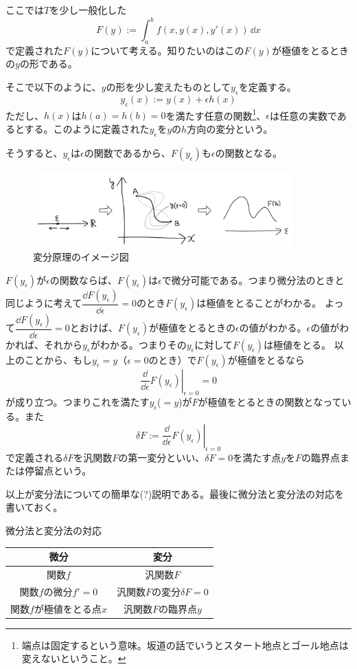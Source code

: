 ここでは$T$を少し一般化した
$$ F(y) := \int_a^b f(x,y(x),y'(x)) \,\dd x$$
で定義された$F(y)$について考える。知りたいのはこの$F(y)$が極値をとるときの$y$の形である。\par
そこで以下のように、$y$の形を少し変えたものとして$y_\epsilon$を定義する。
$$ y_\epsilon (x) := y(x) + \epsilon h(x) $$
ただし、$h(x)$は$h(a) = h(b) = 0$を満たす任意の関数\footnote{端点は固定するという意味。坂道の話でいうとスタート地点とゴール地点は変えないということ。}、$\epsilon$は任意の実数であるとする。このように定義された$y_\epsilon$を$y$の$h$方向の変分という。\par
そうすると、$y_\epsilon$は$\epsilon$の関数であるから、$F(y_\epsilon)$も$\epsilon$の関数となる。\par
\begin{figure}[H]
  \centering
  \includegraphics[width = 100mm]{nakayama1/image/henbun.png}\\
  {\small 変分原理のイメージ図}
\end{figure}

$F(y_\epsilon)$が$\epsilon$の関数ならば、$F(y_\epsilon)$は$\epsilon$で微分可能である。つまり微分法のときと同じように考えて$\dfrac{\dd F(y_\epsilon)}{\dd \epsilon} = 0$のとき$F(y_\epsilon)$は極値をとることがわかる。
よって$\dfrac{\dd F(y_\epsilon)}{\dd \epsilon} = 0$とおけば、$F(y_\epsilon)$が極値をとるときの$\epsilon$の値がわかる。$\epsilon$の値がわかれば、それから$y_\epsilon$がわかる。つまりその$y_\epsilon$に対して$F(y_\epsilon)$は極値をとる。
以上のことから、もし$y_\epsilon = y$（$\epsilon = 0$のとき）で$F(y_\epsilon)$が極値をとるなら
$$\left. \dfrac{\dd}{\dd \epsilon}F(y_\epsilon) \right|_{\epsilon = 0} = 0$$
が成り立つ。つまりこれを満たす$y_\epsilon$($=y$)が$F$が極値をとるときの関数となっている。また
$$\delta F := \left. \dfrac{\dd}{\dd \epsilon}F(y_\epsilon) \right|_{\epsilon = 0}$$
で定義される$\delta F$を汎関数$F$の第一変分といい、$\delta F = 0$を満たす点$y$を$F$の臨界点または停留点という。\par
以上が変分法についての簡単な(?)説明である。最後に微分法と変分法の対応を書いておく。

\begin{table}[H]
  \begin{center}
    {\gt \small 微分法と変分法の対応}\\
    \begin{tabular}{cc}
      微分 & 変分\\ \hline
      関数$f$ & 汎関数$F$\\
      関数$f$の微分$f'=0$ & 汎関数$F$の変分$\delta F=0$\\
      関数$f$が極値をとる点$x$ & 汎関数$F$の臨界点$y$
    \end{tabular}
  \end{center}
\end{table}

